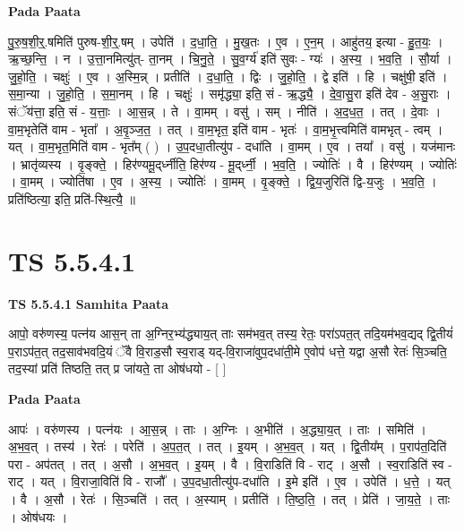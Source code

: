 \documentclass[17pt]{extarticle}
\begin{document}
\textbf{Pada Paata} \newline

पु॒रु॒ष॒शी॒र्॒.षमिति॑ पुरुष-शी॒र्॒.षम् । उपेति॑ । द॒धा॒ति॒ । मु॒ख॒तः । ए॒व । ए॒न॒म् । आहु॑तय॒ इत्या - हु॒त॒यः॒ । ऋ॒च्छ॒न्ति॒ । न । उ॒त्ता॒नमित्यु॑त्- ता॒नम् । चि॒नु॒ते॒ । सु॒व॒र्ग्य॑ इति॑ सुवः - ग्यः॑ । अ॒स्य॒ । भ॒व॒ति॒ । सौ॒र्या । जु॒हो॒ति॒ । चक्षुः॑ । ए॒व । अ॒स्मि॒न्न् । प्रतीति॑ । द॒धा॒ति॒ । द्विः । जु॒हो॒ति॒ । द्वे इति॑ । हि । चक्षु॑षी॒ इति॑ । स॒मा॒न्या । जु॒हो॒ति॒ । स॒मा॒नम् । हि । चक्षुः॑ । समृ॑द्ध्या॒ इति॒ सं - ऋ॒द्ध्यै॒ । दे॒वा॒सु॒रा इति॑ देव - अ॒सु॒राः । संॅय॑त्ता॒ इति॒ सं - य॒त्ताः॒ । आ॒स॒न्न् । ते । वा॒मम् । वसु॑ । सम् । नीति॑ । अ॒द॒ध॒त॒ । तत् । दे॒वाः । वा॒म॒भृतेति॑ वाम - भृता᳚ । अ॒वृ॒ञ्ज॒त॒ । तत् । वा॒म॒भृत॒ इति॑ वाम - भृतः॑ । वा॒म॒भृ॒त्त्वमिति॑ वामभृत् - त्वम् । यत् । वा॒म॒भृत॒मिति॑ वाम - भृत᳚म् ( ) । उ॒प॒दधा॒तीत्यु॑प - दधा॑ति । वा॒मम् । ए॒व । तया᳚ । वसु॑ । यज॑मानः । भ्रातृ॑व्यस्य । वृ॒ङ्क्ते॒ । हिर॑ण्यमू॒द्‌र्ध्नीति॒ हिर॑ण्य - मू॒द्‌र्ध्नी॒ । भ॒व॒ति॒ । ज्योतिः॑ । वै । हिर॑ण्यम् । ज्योतिः॑ । वा॒मम् । ज्योति॑षा । ए॒व । अ॒स्य॒ । ज्योतिः॑ । वा॒मम् । वृ॒ङ्क्ते॒ । द्वि॒य॒जुरिति॑ द्वि-य॒जुः । भ॒व॒ति॒ । प्रति॑ष्ठित्या॒ इति॒ प्रति॑-स्थि॒त्यै॒ ॥  \newline




\section*{ TS 5.5.4.1 }

\textbf{TS 5.5.4.1 } \newline
\textbf{Samhita Paata} \newline

आपो॒ वरु॑णस्य॒ पत्न॑य आस॒न् ता अ॒ग्निर॒भ्य॑द्ध्याय॒त् ताः सम॑भव॒त् तस्य॒ रेतः॒ परा॑ऽपत॒त् तदि॒यम॑भव॒द्यद् द्वि॒तीयं॑ प॒राऽप॑त॒त् तद॒साव॑भवदि॒यं ॅवै वि॒राड॒सौ स्व॒राड् यद्-वि॒राजा॑वुप॒दधा॑ती॒मे ए॒वोप॑ धत्ते॒ यद्वा अ॒सौ रेतः॑ सि॒ञ्चति॒ तद॒स्यां प्रति॑ तिष्ठति॒ तत् प्र जा॑यते॒ ता ओष॑धयो - [  ] \newline

\textbf{Pada Paata} \newline

आपः॑ । वरु॑णस्य । पत्न॑यः । आ॒स॒न्न् । ताः । अ॒ग्निः । अ॒भीति॑ । अ॒द्ध्या॒य॒त् । ताः । समिति॑ । अ॒भ॒व॒त् । तस्य॑ । रेतः॑ । परेति॑ । अ॒प॒त॒त् । तत् । इ॒यम् । अ॒भ॒व॒त् । यत् । द्वि॒तीय᳚म् । प॒राप॑त॒दिति॑ परा - अप॑तत् । तत् । अ॒सौ । अ॒भ॒व॒त् । इ॒यम् । वै । वि॒राडिति॑ वि - राट् । अ॒सौ । स्व॒राडिति॑ स्व - राट् । यत् । वि॒राजा॒विति॑ वि - राजौ᳚ । उ॒प॒दधा॒तीत्यु॑प-दधा॑ति । इ॒मे इति॑ । ए॒व । उपेति॑ । ध॒त्ते॒ । यत् । वै । अ॒सौ । रेतः॑ । सि॒ञ्चति॑ । तत् । अ॒स्याम् । प्रतीति॑ । ति॒ष्ठ॒ति॒ । तत् । प्रेति॑ । जा॒य॒ते॒ । ताः । ओष॑धयः ।  \newline
\end{document}
